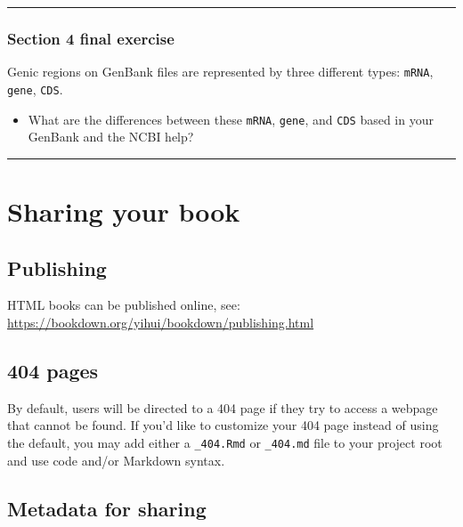 \documentclass[
]{book}
\providecommand{\tightlist}{%
  \setlength{\itemsep}{0pt}\setlength{\parskip}{0pt}}
\begin{document}
\begin{center}\rule{0.5\linewidth}{0.5pt}\end{center}

\hypertarget{section-4-final-exercise}{%
\subsection{Section 4 final exercise}\label{section-4-final-exercise}}

Genic regions on GenBank files are represented by three different types: \texttt{mRNA}, \texttt{gene}, \texttt{CDS}.

\begin{itemize}
\tightlist
\item
  What are the differences between these \texttt{mRNA}, \texttt{gene}, and \texttt{CDS} based in your GenBank and the NCBI help?
\end{itemize}

\begin{center}\rule{0.5\linewidth}{0.5pt}\end{center}

\hypertarget{sharing-your-book}{%
\chapter{Sharing your book}\label{sharing-your-book}}

\hypertarget{publishing}{%
\section{Publishing}\label{publishing}}

HTML books can be published online, see: \url{https://bookdown.org/yihui/bookdown/publishing.html}

\hypertarget{pages}{%
\section{404 pages}\label{pages}}

By default, users will be directed to a 404 page if they try to access a webpage that cannot be found. If you'd like to customize your 404 page instead of using the default, you may add either a \texttt{\_404.Rmd} or \texttt{\_404.md} file to your project root and use code and/or Markdown syntax.

\hypertarget{metadata-for-sharing}{%
\section{Metadata for sharing}\label{metadata-for-sharing}}
\end{document}
